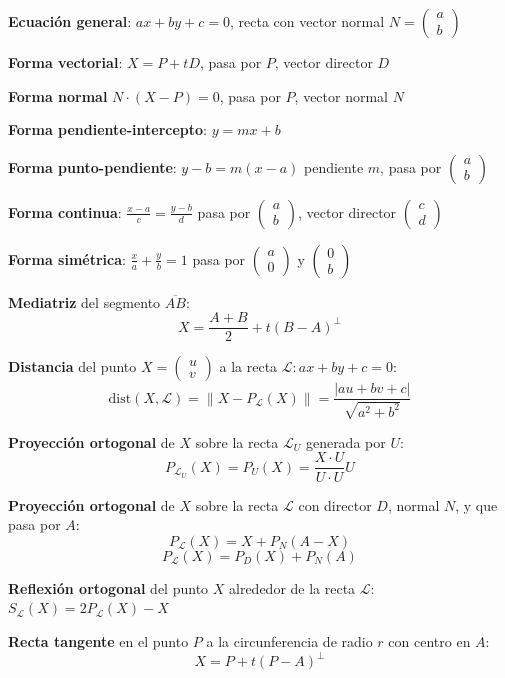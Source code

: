 \documentclass[11pt]{article}
\newcommand{\vect}[2]{\begin{pmatrix}#1\\#2\end{pmatrix}}
\begin{document}
\begin{minipage}[t]{0.48\linewidth}
\textbf{Ecuación general}: $ax+by+c=0$, recta con vector normal $N=\vect{a}{b}$

\vspace{4pt}
\textbf{Forma vectorial}: $X=P+tD$, pasa por $P$, vector director $D$

\vspace{4pt}
\textbf{Forma normal} $N\cdot(X-P)=0$, pasa por $P$, vector normal $N$

\vspace{4pt}
\textbf{Forma pendiente-intercepto}: $y=mx+b$

\vspace{4pt}
\textbf{Forma punto-pendiente}: $y-b=m(x-a)$ pendiente $m$, pasa por $\vect{a}{b}$

\vspace{4pt}
\textbf{Forma continua}: $\frac{x-a}{c}=\frac{y-b}{d}$ pasa por $\vect{a}{b}$, vector director $\vect{c}{d}$

\vspace{4pt}
\textbf{Forma simétrica}: $\frac{x}{a}+\frac{y}{b}=1$ pasa por $\vect{a}{0}$ y $\vect{0}{b}$

\vspace{4pt}
\textbf{Mediatriz} del segmento $\overline{AB}$:
\[
X = \frac{A+B}{2} + t(B-A)^\perp
\]
\end{minipage}%
\hfill
\begin{minipage}[t]{0.48\linewidth}
\textbf{Distancia} del punto $X=\vect{u}{v}$ a la recta $\mathcal{L}: ax+by+c=0$:
\[
\text{dist}(X,\mathcal{L}) = \|X-P_\mathcal{L}(X)\| = \frac{|au+bv+c|}{\sqrt{a^2+b^2}}
\]

\vspace{4pt}
\textbf{Proyección ortogonal} de $X$ sobre la recta $\mathcal{L}_U$ generada por $U$:
\[
P_{\mathcal{L}_U}(X) = P_U(X) = \frac{X\cdot U}{U\cdot U}U
\]

\vspace{4pt}
\textbf{Proyección ortogonal} de $X$ sobre la recta $\mathcal{L}$ con director $D$, normal $N$, y que pasa por $A$:
\[
P_\mathcal{L}(X) = X + P_N(A-X)
\]
\[
P_\mathcal{L}(X) = P_D(X) + P_N(A)
\]

\vspace{4pt}
\textbf{Reflexión ortogonal} del punto $X$ alrededor de la recta $\mathcal{L}$: $S_\mathcal{L}(X) = 2P_\mathcal{L}(X)-X$

\vspace{4pt}
\textbf{Recta tangente} en el punto $P$ a la circunferencia de radio $r$ con centro en $A$:
\[
X = P + t(P-A)^\perp
\]
\end{minipage}
\end{document}
